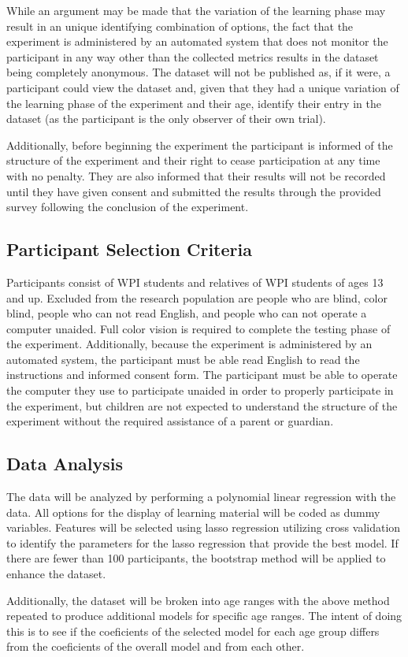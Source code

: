 \documentclass[12pt]{article}
\begin{document}
While an argument may be made that the variation of the learning phase may result in an unique identifying combination of options, the fact that the experiment is administered by an automated system that does not monitor the participant in any way other than the collected metrics results in the dataset being completely anonymous. The dataset will not be published as, if it were, a participant could view the dataset and, given that they had a unique variation of the learning phase of the experiment and their age, identify their entry in the dataset (as the participant is the only observer of their own trial).

Additionally, before beginning the experiment the participant is informed of the structure of the experiment and their right to cease participation at any time with no penalty. They are also informed that their results will not be recorded until they have given consent and submitted the results through the provided survey following the conclusion of the experiment.

\subsection{Participant Selection Criteria}

Participants consist of WPI students and relatives of WPI students of ages 13 and up. Excluded from the research population are people who are blind, color blind, people who can not read English, and people who can not operate a computer unaided. Full color vision is required to complete the testing phase of the experiment. Additionally, because the experiment is administered by an automated system, the participant must be able read English to read the instructions and informed consent form. The participant must be able to operate the computer they use to participate unaided in order to properly participate in the experiment, but children are not expected to understand the structure of the experiment without the required assistance of a parent or guardian.

\subsection{Data Analysis}

The data will be analyzed by performing a polynomial linear regression \cite{peckov2012machine} with the data. All options for the display of learning material will be coded as dummy variables. Features will be selected using lasso regression utilizing cross validation to identify the parameters for the lasso regression that provide the best model. If there are fewer than 100 participants, the bootstrap method \cite{kohavi1995study} will be applied to enhance the dataset.

Additionally, the dataset will be broken into age ranges with the above method repeated to produce additional models for specific age ranges. The intent of doing this is to see if the coeficients of the selected model for each age group differs from the coeficients of the overall model and from each other.



\end{document}
